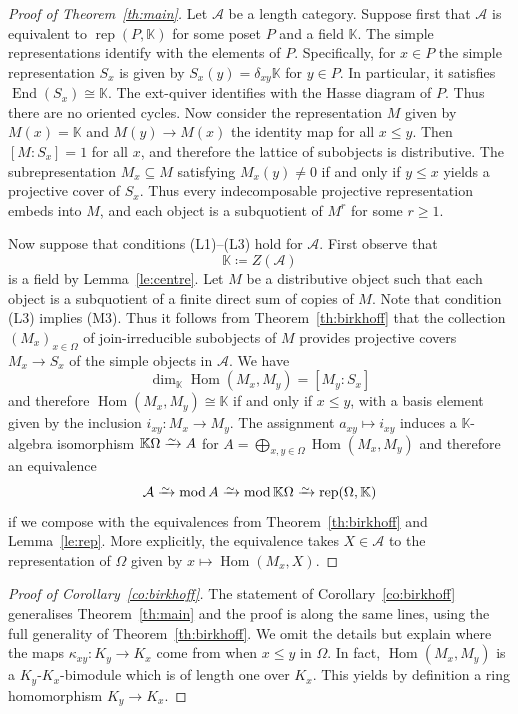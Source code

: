 \documentclass[a4paper]{amsart}
\theoremstyle{plain}
\theoremstyle{definition}
\theoremstyle{remark}
\numberwithin{equation}{section}
\renewcommand{\dim}{\operatorname{dim}}
\newcommand{\End}{\operatorname{End}}
\newcommand{\Hom}{\operatorname{Hom}}
\renewcommand{\mod}{\operatorname{mod}}
\newcommand{\rep}{\operatorname{rep}}
\newcommand{\iso}{\xrightarrow{\raisebox{-.4ex}[0ex][0ex]{$\scriptstyle{\sim}$}}}
\def\A{\mathcal A}
\def\bbK{\mathbb K}
\def\Om{\Omega}
\begin{document}
\begin {proof}[Proof of Theorem~\ref{th:main}]
  Let $\A$ be a length category. Suppose first that $\A$ is equivalent
  to $\rep(P,\bbK)$ for some poset $P$ and a field $\bbK$. The
  simple representations identify with the elements of
  $P$. Specifically, for $x\in P$ the simple representation $S_x$ is
  given by $S_x(y)=\delta_{xy}\bbK$ for $y\in P$. In particular, it
  satisfies $\End(S_x)\cong \bbK$.  The ext-quiver identifies with the
  Hasse diagram of $P$. Thus there are no oriented cycles. Now
  consider the representation $M$ given by $M(x)=\bbK$ and
  $M(y)\to M(x)$ the identity map for all $x\le y$. Then $[M:S_x]=1$
  for all $x$, and therefore the lattice of subobjects is
  distributive. The subrepresentation $M_x\subseteq M$ satisfying
  $M_x(y)\neq 0$ if and only if $y\le x$ yields a projective cover of
  $S_x$. Thus every indecomposable projective representation embeds
  into $M$, and each object is a subquotient of $M^r$ for some
  $r\ge 1$.

  Now suppose that conditions (L1)--(L3) hold for $\A$. First observe
  that
\[\bbK\coloneqq Z(\A)\] is a field by
Lemma~\ref{le:centre}. Let $M$ be a distributive object such that each
object is a subquotient of a finite direct sum of copies of $M$. Note
that condition (L3) implies (M3). Thus it follows from Theorem~\ref{th:birkhoff}
that the collection $(M_x)_{x\in\Om}$ of join-irreducible subobjects
of $M$ provides projective covers $M_x\to S_x$ of the simple objects
in $\A$. We have \[\dim_\bbK\Hom(M_x,M_y)=[M_y:S_x]\] and therefore
$\Hom(M_x,M_y) \cong \bbK$ if and only if $x\le y$, with a basis
element given by the inclusion $i_{xy}\colon M_x\to M_y$. The
assignment $a_{xy}\mapsto i_{xy}$ induces a $\bbK$-algebra isomorphism
$\bbK\Om\iso A$ for $A=\bigoplus_{x,y\in\Om}\Hom(M_x,M_y)$ and
therefore an equivalence
\[\A\iso\mod A\iso\mod\bbK\Om\iso\rep (\Om,\bbK)\]
if we compose with the equivalences from Theorem~\ref{th:birkhoff} and
Lemma~\ref{le:rep}. More explicitly, the equivalence takes $X\in\A$ to
the representation of $\Om$ given by $x\mapsto\Hom(M_x,X)$.
\end{proof}

\begin {proof}[Proof of Corollary~\ref{co:birkhoff}]
  The statement of Corollary~\ref{co:birkhoff} generalises Theorem~\ref{th:main} and
  the proof is along the same lines, using the full generality of
  Theorem~\ref{th:birkhoff}. We omit the details but explain where the
  maps $\kappa_{xy}\colon K_y\to K_x$ come from when $x\le y$ in
  $\Om$. In fact, $\Hom(M_x,M_y)$ is a $K_y$-$K_x$-bimodule which
  is of length one over $K_x$. This yields by definition a ring
  homomorphism $K_y\to K_x$.
\end{proof}  
  
\end{document}
